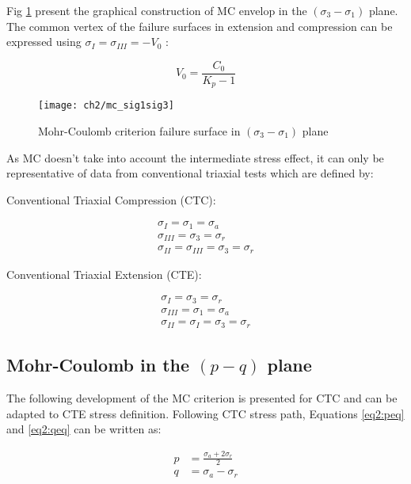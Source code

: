 Fig \ref{fig2:mc_sig1sig3} present the graphical construction of MC envelop in the $(\sigma_3 -\sigma_1)$ plane. The common vertex of the failure surfaces in extension and compression can be expressed using $\sigma_I = \sigma_{III} = -V_0$ :

\begin{equation}\label{eq2:MC_Vo}
    V_0 = \frac{C_0}{K_p-1}
\end{equation}


\begin{figure}[tb]
    \centering
    \texttt{[image: ch2/mc\_sig1sig3]}
    \caption{Mohr-Coulomb criterion failure surface in  $(\sigma_3 -\sigma_1)$ plane}
    \label{fig2:mc_sig1sig3}
\end{figure}

As MC doesn’t take into account the intermediate stress effect, it can only be representative of data from conventional triaxial tests which are defined by:

Conventional Triaxial Compression (CTC): 

\begin{align*}
    \sigma_I = \sigma_1 = \sigma_a \\
    \sigma_{III} = \sigma_3 = \sigma_r\\
    \sigma_{II} = \sigma_{III} = \sigma_3 = \sigma_r
\end{align*}

Conventional Triaxial Extension (CTE):

\begin{align*}
    \sigma_I = \sigma_3 = \sigma_r \\
    \sigma_{III} = \sigma_1 = \sigma_a\\
    \sigma_{II} = \sigma_{I} = \sigma_3 = \sigma_r
\end{align*}

\subsection{Mohr-Coulomb in the \texorpdfstring{$(p - q)$}{p - q} plane} \label{ch2:MC-pq}

The following development of the MC criterion is presented for CTC and can be adapted to CTE stress definition. Following CTC stress path, Equations \ref{eq2:peq} and \ref{eq2:qeq} can be written as: 

\begin{align}
    p &= \frac{\sigma_a+2\sigma_r}{2} \label{eq2:p2} \\
    q &= \sigma_a - \sigma_r \label{eq2:q2}
\end{align}

